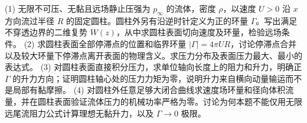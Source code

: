 (1) 无限不可压、无黏且远场静止压强为 \(p_\infty\) 的流体，密度 \(\rho\)，以速度 \(U>0\) 沿 \(x\) 方向流过半径 \(R\) 的固定圆柱。圆柱外另有沿逆时针定义为正的环量 \(\Gamma\)。写出满足不穿透边界的二维复势 \(W(z)\)，从中求圆柱表面切向速度及环量，检验远场条件。
(2) 求圆柱表面全部停滞点的位置和临界环量 \(|\Gamma|=4\pi UR\)，讨论停滞点合并以及较大环量下停滞点离开表面的物理含义。求压力分布及表面压力最大、最小的表达式。
(3) 对圆柱表面直接积分压力，求单位轴向长度上的阻力和升力，明确正 \(\Gamma\) 的升力方向；证明圆柱轴心处的压力力矩为零，说明升力来自横向动量输运而不是局部有黏摩擦。
(4) 对圆柱外任意足够大闭合曲线求速度场环量和径向体积流量，并在圆柱表面验证流体压力的机械功率严格为零。讨论为何本题不能仅用无限远尾流阻力公式计算理想无黏升力，以及 \(\Gamma\to0\) 极限。
